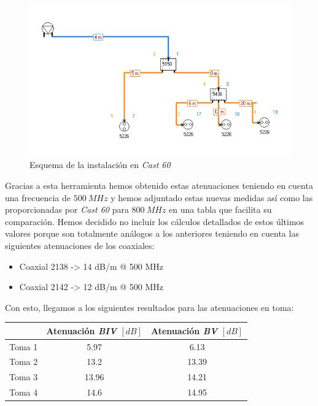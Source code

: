 \documentclass{article}[12 pt]
\begin{document}
			\begin{figure}
				\centering
				\includegraphics[scale=0.8]{esquema_mitad.png}
				\caption{Esquema de la instalación en \textit{Cast 60}}
				\label{f:cast60}
			\end{figure}

			Gracias a esta herramienta hemos obtenido estas atenuaciones teniendo en cuenta una frecuencia de $500\ MHz$ y hemos adjuntado estas nuevas medidas así como las proporcionadas por \textit{Cast 60} para $800\ MHz$ en una tabla que facilita su comparación. Hemos decidido no incluir los cálculos detallados de estos últimos valores porque son totalmente análogos a los anteriores teniendo en cuenta las siguientes atenuaciones de los coaxiales:

			\begin{itemize}
				\item Coaxial 2138 -> 14 dB/m @ 500 MHz
				\item Coaxial 2142 -> 12 dB/m @ 500 MHz
			\end{itemize}

			Con esto, llegamos a los siguientes resultados para las atenuaciones en toma:

			\begin{center}
				\begin{tabular}{| c | c | c |}
					\hline
					& Atenuación \textit{BIV} $[dB]$ & Atenuación \textit{BV} $[dB]$\\
					\hline
					Toma 1 & 5.97 & 6.13\\
					\hline
					Toma 2 & 13.2 & 13.39\\
					\hline
					Toma 3 & 13.96 & 14.21\\
					\hline
					Toma 4 & 14.6 & 14.95\\
					\hline
				\end{tabular}
			\end{center}
\end{document}
